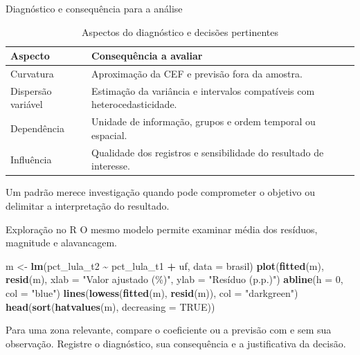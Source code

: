 \documentclass[
  ignorenonframetext,
  brazilian,
  aspectratio=169,
  10pt]{beamer}
\newenvironment{Shaded}{\begin{snugshade}}{\end{snugshade}}
\newcommand{\AttributeTok}[1]{\textcolor[rgb]{0.13,0.29,0.53}{#1}}
\newcommand{\ConstantTok}[1]{\textcolor[rgb]{0.56,0.35,0.01}{#1}}
\newcommand{\DecValTok}[1]{\textcolor[rgb]{0.00,0.00,0.81}{#1}}
\newcommand{\FunctionTok}[1]{\textcolor[rgb]{0.13,0.29,0.53}{\textbf{#1}}}
\newcommand{\NormalTok}[1]{#1}
\newcommand{\OtherTok}[1]{\textcolor[rgb]{0.56,0.35,0.01}{#1}}
\newcommand{\SpecialCharTok}[1]{\textcolor[rgb]{0.81,0.36,0.00}{\textbf{#1}}}
\newcommand{\StringTok}[1]{\textcolor[rgb]{0.31,0.60,0.02}{#1}}
\begin{document}
\begin{frame}{Diagnóstico e consequência para a análise}
\protect{}\label{diagnuxf3stico-e-consequuxeancia-para-a-anuxe1lise}
\small
\begin{table}
\centering
\caption{Aspectos do diagnóstico e decisões pertinentes}
\begin{tabular}{p{}p{}}
\toprule
Aspecto & Consequência a avaliar \\
\midrule
Curvatura & Aproximação da CEF e previsão fora da amostra. \\
Dispersão variável & Estimação da variância e intervalos compatíveis com heterocedasticidade. \\
Dependência & Unidade de informação, grupos e ordem temporal ou espacial. \\
Influência & Qualidade dos registros e sensibilidade do resultado de interesse. \\
\bottomrule
\end{tabular}
\end{table}

Um padrão merece investigação quando pode comprometer o objetivo ou
delimitar a interpretação do resultado.
\end{frame}

\begin{frame}[fragile]{Exploração no R}
\protect{}\label{explorauxe7uxe3o-no-r}
O mesmo modelo permite examinar média dos resíduos, magnitude e
alavancagem.

\begin{Shaded}
\begin{Highlighting}[]
\NormalTok{m }\OtherTok{\textless{}{-}} \FunctionTok{lm}\NormalTok{(pct\_lula\_t2 }\SpecialCharTok{\textasciitilde{}}\NormalTok{ pct\_lula\_t1 }\SpecialCharTok{+}\NormalTok{ uf, }\AttributeTok{data =}\NormalTok{ brasil)}
\FunctionTok{plot}\NormalTok{(}\FunctionTok{fitted}\NormalTok{(m), }\FunctionTok{resid}\NormalTok{(m), }\AttributeTok{xlab =} \StringTok{"Valor ajustado (\%)"}\NormalTok{,}
     \AttributeTok{ylab =} \StringTok{"Resíduo (p.p.)"}\NormalTok{)}
\FunctionTok{abline}\NormalTok{(}\AttributeTok{h =} \DecValTok{0}\NormalTok{, }\AttributeTok{col =} \StringTok{"blue"}\NormalTok{)}
\FunctionTok{lines}\NormalTok{(}\FunctionTok{lowess}\NormalTok{(}\FunctionTok{fitted}\NormalTok{(m), }\FunctionTok{resid}\NormalTok{(m)), }\AttributeTok{col =} \StringTok{"darkgreen"}\NormalTok{)}
\FunctionTok{head}\NormalTok{(}\FunctionTok{sort}\NormalTok{(}\FunctionTok{hatvalues}\NormalTok{(m), }\AttributeTok{decreasing =} \ConstantTok{TRUE}\NormalTok{))}
\end{Highlighting}
\end{Shaded}

Para uma zona relevante, compare o coeficiente ou a previsão com e sem
sua observação. Registre o diagnóstico, sua consequência e a
justificativa da decisão.
\end{frame}
\end{document}
